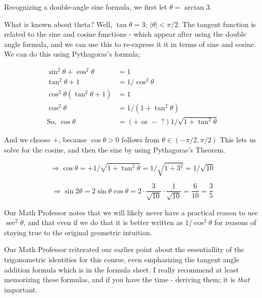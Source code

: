 \documentclass{article}
\begin{document}
\vspace{10pt}

Recognizing a double-angle sine formula, we first let $\theta=\arctan3$.

\vspace{10pt}

What is known about theta? Well, $\tan\theta=3;\ |\theta|<\pi/2$. The tangent function is related to the sine and cosine functions - which appear after using the double angle formula, and we can use this to re-express it it in terms of sine and cosine. We can do this using Pythagoras's formula;

\begin{align*}
\sin^2\theta+\cos^2\theta&=1\\
\tan^2\theta+1&=1/\cos^2\theta\\
\cos^2\theta(\tan^2\theta+1)&=1\\
\cos^2\theta&=1/(1+\tan^2\theta)\\
\mbox{So, }\cos\theta&=(+\mbox{ or }-\mbox{ ?})1/\sqrt{1+\tan^2\theta}
\end{align*}

\vspace{10pt}

And we choose $+$, because $\cos\theta>0$ follows from $\theta\in(-\pi/2,\pi/2)$ This lets us solve for the cosine, and then the sine  by using Pythagoras's Theorem.

\[\Rightarrow\cos\theta=+1/\sqrt{1+\tan^2\theta}=1/\sqrt{1+3^2}=1/\sqrt{10}\]

\[\Rightarrow\sin2\theta=2\sin\theta\cos\theta=2\cdot\frac{3}{\sqrt{10}}\cdot\frac{1}{\sqrt{10}}=\frac{6}{10}=\frac{3}{5}\]

\vspace{10pt}

Our Math Professor notes that we will likely never have a practical reason to use $\sec^2\theta$, and that even if we do that it is better written as $1/\cos^2\theta$ for reasons of staying true to the original geometric intuition.

\vspace{10pt}

Our Math Professor reiterated our earlier point about the essentiallity of the trigonometric identities for this course, even emphasizing the tangent angle addition formula which is in the formula sheet. I really recommend at least memorizing these formulas, and if you have the time - deriving them; it is \textit{that} important.

\vspace{10pt}
\end{document}

